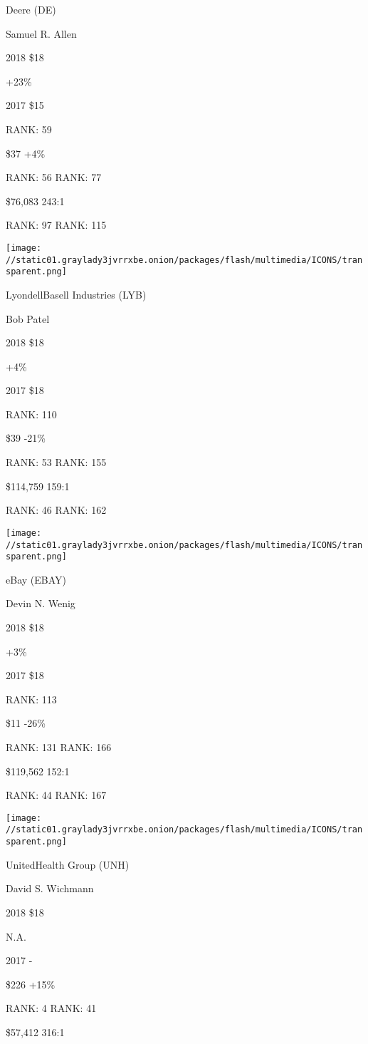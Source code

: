 Deere (DE)

Samuel R. Allen \protect\hyperlink{g-footnotes}{}

2018 \$18

 +23\%

2017 \$15

RANK: 59

 \$37 +4\%

RANK: 56 RANK: 77

 \$76,083 243:1

RANK: 97 RANK: 115

\texttt{[image: //static01.graylady3jvrrxbe.onion/packages/flash/multimedia/ICONS/transparent.png]}

LyondellBasell Industries (LYB)

Bob Patel \protect\hyperlink{g-footnotes}{}

2018 \$18

 +4\%

2017 \$18

RANK: 110

 \$39 -21\%

RANK: 53 RANK: 155

 \$114,759 159:1

RANK: 46 RANK: 162

\texttt{[image: //static01.graylady3jvrrxbe.onion/packages/flash/multimedia/ICONS/transparent.png]}

eBay (EBAY)

Devin N. Wenig \protect\hyperlink{g-footnotes}{}

2018 \$18

 +3\%

2017 \$18

RANK: 113

 \$11 -26\%

RANK: 131 RANK: 166

 \$119,562 152:1

RANK: 44 RANK: 167

\texttt{[image: //static01.graylady3jvrrxbe.onion/packages/flash/multimedia/ICONS/transparent.png]}

UnitedHealth Group (UNH)

David S. Wichmann \protect\hyperlink{g-footnotes}{}

2018 \$18

 N.A.

2017 -

 \$226 +15\%

RANK: 4 RANK: 41

 \$57,412 316:1

